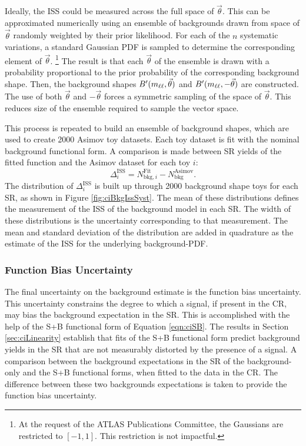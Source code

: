 Ideally, the ISS could be measured across the full space of $\vec{\theta}$.
This can be approximated numerically using an ensemble of backgrounds drawn from space of $\vec{\theta}$ randomly weighted by their prior likelihood.
For each of the $n$ systematic variations, a standard Gaussian PDF is sampled to determine the corresponding element of $\vec{\theta}$. \footnote{At the request of the ATLAS Publications Committee, the Gaussians are restricted to $[-1,1]$. This restriction is not impactful.}
The result is that each $\vec{\theta}$ of the ensemble is drawn with a probability proportional to the prior probability of the corresponding background shape.
Then, the background shapes $B'(m_{\ell\ell},\vec{\theta})$ and $B'(m_{\ell\ell},-\vec{\theta})$ are constructed.
The use of both $\vec{\theta}$ and $-\vec{\theta}$ forces a symmetric sampling of the space of $\vec{\theta}$. 
This reduces size of the ensemble required to sample the vector space.

This process is repeated to build an ensemble of background shapes, which are used to create 2000 Asimov toy datasets.
Each toy dataset is fit with the nominal background functional form.
A comparison is made between SR yields of the fitted function and the Asimov dataset for each toy $i$:
\begin{equation*}
    \Delta_i^\text{ISS}=N_{\text{bkg},i}^\text{Fit}-N_\text{bkg}^\text{Asimov}.
\end{equation*}
The distribution of $\Delta_i^\text{ISS}$ is built up through 2000 background shape toys for each SR, as shown in Figure \ref{fig:ciBkgIssSyst}.
The mean of these distributions defines the measurement of the ISS of the background model in each SR.
The width of these distributions is the uncertainty corresponding to that measurement.
The mean and standard deviation of the distribution are added in quadrature as the estimate of the ISS for the underlying background-PDF.

\subsubsection{Function Bias Uncertainty}

The final uncertainty on the background estimate is the function bias uncertainty.
This uncertainty constrains the degree to which a signal, if present in the CR, may bias the background expectation in the SR.
This is accomplished with the help of the S+B functional form of Equation \ref{eqn:ciSB}.
The results in Section \ref{sec:ciLinearity} establish that fits of the S+B functional form predict background yields in the SR that are not measurably distorted by the presence of a signal.
A comparison between the background expectations in the SR of the background-only and the S+B functional forms, when fitted to the data in the CR.
The difference between these two backgrounds expectations is taken to provide the function bias uncertainty.

